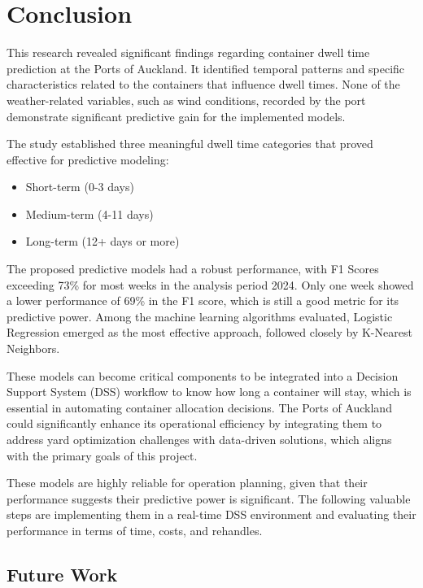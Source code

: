 \chapter{Conclusion}%

	This research revealed significant findings regarding container dwell time prediction at the Ports of Auckland. It
	identified temporal patterns and specific characteristics related to the containers that influence dwell times.
	None of the weather-related variables, such as wind conditions, recorded by the port demonstrate significant
	predictive gain for the implemented models.

	The study established three meaningful dwell time categories that proved effective for predictive modeling:
	\begin{itemize}
		\item Short-term (0-3 days)
		\item Medium-term (4-11 days)
		\item Long-term (12+ days or more)
	\end{itemize}

	The proposed predictive models had a robust performance, with F1 Scores exceeding 73\%
	for most weeks in the analysis period 2024. Only one week showed a lower performance of 69\%
	in the F1 score, which is still a good metric for its predictive power. Among the machine learning
	algorithms evaluated, Logistic Regression emerged as the most effective approach, followed closely by
	K-Nearest Neighbors.


	These models can become critical components to be integrated into a Decision Support System (DSS) workflow to know
	how long a container will stay, which is essential in automating container allocation decisions. The Ports of
	Auckland could significantly enhance its operational efficiency by integrating them to address yard optimization
	challenges with data-driven solutions, which aligns with the primary goals of this project.

	These models are highly reliable for operation planning, given that their performance suggests their predictive
	power is significant. The following valuable steps are implementing them in a real-time DSS environment and
	evaluating their performance in terms of time, costs, and rehandles.


	\section{Future Work}

